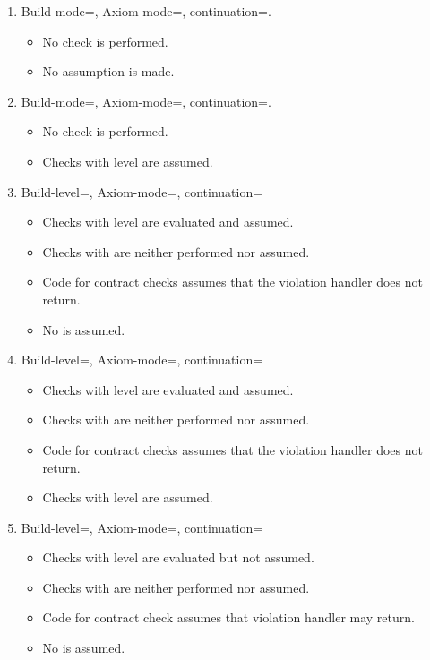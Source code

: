 \begin{enumerate}

\item Build-mode=, Axiom-mode=, continuation=.
\begin{itemize}
  \item No check is performed.
  \item No assumption is made.
\end{itemize}

\item Build-mode=, Axiom-mode=, continuation=.
\begin{itemize}
  \item No check is performed.
  \item Checks with  level are assumed.
\end{itemize}

\item Build-level=, Axiom-mode=, continuation=
\begin{itemize}
  \item Checks with  level are evaluated and assumed.
  \item Checks with  are neither performed nor assumed.
  \item Code for  contract checks 
	  assumes that the violation handler does not return.
  \item No  is assumed.
\end{itemize}

\item Build-level=, Axiom-mode=, continuation=
\begin{itemize}
  \item Checks with  level are evaluated and assumed.
  \item Checks with  are neither performed nor assumed.
  \item Code for  contract checks 
	  assumes that the violation handler does not return.
  \item Checks with  level are assumed.
\end{itemize}

\item Build-level=, Axiom-mode=, continuation=
\begin{itemize}
  \item Checks with  level are evaluated but not assumed.
  \item Checks with  are neither performed nor assumed.
  \item Code for  contract check assumes 
	  that violation handler may return.
  \item No  is assumed.
\end{itemize}


\end{enumerate}
